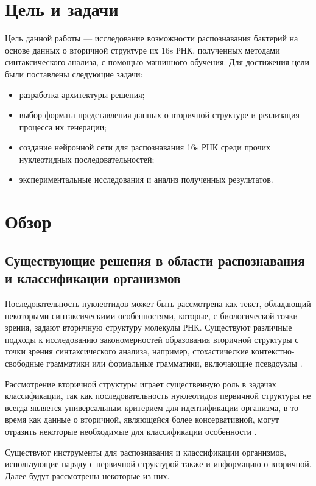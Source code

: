 \documentclass[14pt]{matmex-diploma}
\begin{document}
\section{Цель и задачи}
Цель данной работы --- исследование возможности распознавания бактерий на основе данных о вторичной структуре их 16s РНК, полученных методами синтаксического анализа, с помощью машинного обучения.
Для достижения цели были поставлены следующие задачи:
\begin{itemize}
    \item разработка архитектуры решения;
    \item выбор формата представления данных о вторичной структуре и реализация процесса их генерации;
    \item создание нейронной сети для распознавания 16s РНК среди прочих нуклеотидных последовательностей;
    \item экспериментальные исследования и анализ полученных результатов.
\end{itemize}

\section{Обзор}
\subsection{Существующие решения в области распознавания и классификации организмов}
Последовательность нуклеотидов может быть рассмотрена как текст, обладающий некоторыми синтаксическими особенностями, которые, с биологической точки зрения, задают вторичную структуру молекулы РНК. Существуют различные подходы к исследованию закономерностей образования вторичной структуры с точки зрения синтаксического анализа, например, стохастические контекстно-свободные грамматики \cite{10} или формальные грамматики, включающие псевдоузлы \cite{11}.

Рассмотрение вторичной структуры играет существенную роль в задачах классификации, так как последовательность нуклеотидов первичной структуры не всегда является универсальным критерием для идентификации организма, в то время как данные о вторичной, являющейся более консервативной, могут отразить некоторые необходимые для классификации особенности \cite{12}.

Существуют инструменты  для распознавания и классификации организмов, использующие наряду с первичной структурой также и информацию о вторичной. Далее будут рассмотрены некоторые из них.
\end{document}
